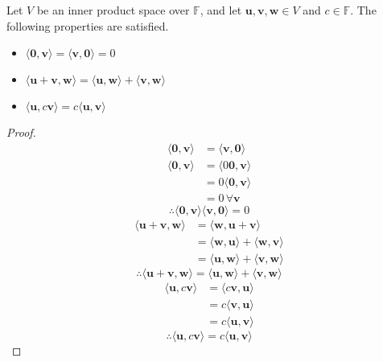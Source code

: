\begin{theorem}\label{propyyy}
    Let \(V\) be an inner product space over \(\mathbb{F} \), and let \(\mathbf{u} ,\mathbf{v} ,\mathbf{w} \in V\) and \(c\in\mathbb{F} \). The following properties are satisfied. 
    \begin{itemize}
        \item \(\langle \mathbf{0},\mathbf{v}   \rangle= \langle \mathbf{v} ,\mathbf{0}  \rangle =0 \) 
        \item \(\langle \mathbf{u} +\mathbf{v} ,\mathbf{w}  \rangle=\langle \mathbf{u} ,\mathbf{w}  \rangle+\langle \mathbf{v} ,\mathbf{w}  \rangle   \) 
        \item \(\langle \mathbf{u} ,c \mathbf{v}  \rangle=c\langle \mathbf{u} ,\mathbf{v}  \rangle  \) 
    \end{itemize}
\end{theorem}
\begin{proof}
    \begin{align*}
        \langle \mathbf{0},\mathbf{v}   \rangle &= \langle \mathbf{v},\mathbf{0}  \rangle\\  
        \langle \mathbf{0},\mathbf{v}   \rangle&= \langle 0 \mathbf{0},\mathbf{v}   \rangle \\
        &= 0\langle \mathbf{0},\mathbf{v}   \rangle \\
        &=0 \,\forall \mathbf{v} 
    \end{align*}
    \[
        \therefore \langle \mathbf{0},\mathbf{v}   \rangle \langle \mathbf{v} ,\mathbf{0}  \rangle =0
    \]
    \begin{align*}
        \langle \mathbf{u} +\mathbf{v} ,\mathbf{w}  \rangle&=\langle \mathbf{w} ,\mathbf{u} +\mathbf{v}  \rangle \\
        &= \langle \mathbf{w} ,\mathbf{u}  \rangle+\langle \mathbf{w} ,\mathbf{v}  \rangle  \\
        &=\langle \mathbf{u} ,\mathbf{w}  \rangle+\langle \mathbf{v} ,\mathbf{w}  \rangle  
    \end{align*}
    \[
        \therefore \langle \mathbf{u} +\mathbf{v} ,\mathbf{w}  \rangle=\langle \mathbf{u} ,\mathbf{w}  \rangle+\langle \mathbf{v} ,\mathbf{w}  \rangle   
    \]
    \begin{align*}
        \langle \mathbf{u} ,c \mathbf{v}  \rangle &= \langle c \mathbf{v} ,\mathbf{u}  \rangle \\
        &= c\langle \mathbf{v} ,\mathbf{u}  \rangle\\
        &= c\langle \mathbf{u} ,\mathbf{v}  \rangle  
    \end{align*}
    \[
        \therefore \langle \mathbf{u} ,c \mathbf{v}  \rangle =c\langle \mathbf{u} ,\mathbf{v}  \rangle 
    \]
\end{proof}
